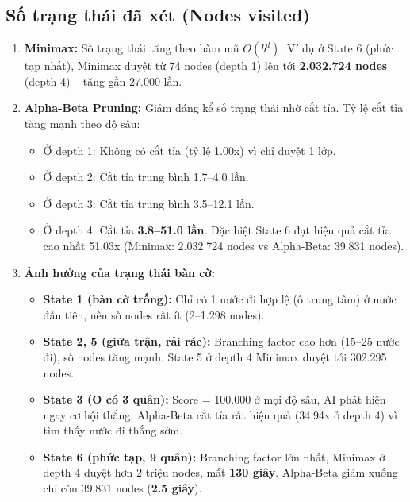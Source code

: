 \documentclass[12pt,a4paper]{article}
\begin{document}
\subsection{Số trạng thái đã xét (Nodes visited)}

\begin{enumerate}
    \item \textbf{Minimax:} Số trạng thái tăng theo hàm mũ $O(b^d)$. Ví dụ ở State 6 (phức tạp nhất), Minimax duyệt từ 74 nodes (depth 1) lên tới \textbf{2.032.724 nodes} (depth 4) -- tăng gần 27.000 lần.

    \item \textbf{Alpha-Beta Pruning:} Giảm đáng kể số trạng thái nhờ cắt tỉa. Tỷ lệ cắt tỉa tăng mạnh theo độ sâu:
    \begin{itemize}
        \item Ở depth 1: Không có cắt tỉa (tỷ lệ 1.00x) vì chỉ duyệt 1 lớp.
        \item Ở depth 2: Cắt tỉa trung bình 1.7--4.0 lần.
        \item Ở depth 3: Cắt tỉa trung bình 3.5--12.1 lần.
        \item Ở depth 4: Cắt tỉa \textbf{3.8--51.0 lần}. Đặc biệt State 6 đạt hiệu quả cắt tỉa cao nhất 51.03x (Minimax: 2.032.724 nodes vs Alpha-Beta: 39.831 nodes).
    \end{itemize}

    \item \textbf{Ảnh hưởng của trạng thái bàn cờ:}
    \begin{itemize}
        \item \textbf{State 1 (bàn cờ trống):} Chỉ có 1 nước đi hợp lệ (ô trung tâm) ở nước đầu tiên, nên số nodes rất ít (2--1.298 nodes).
        \item \textbf{State 2, 5 (giữa trận, rải rác):} Branching factor cao hơn (15--25 nước đi), số nodes tăng mạnh. State 5 ở depth 4 Minimax duyệt tới 302.295 nodes.
        \item \textbf{State 3 (O có 3 quân):} Score = 100.000 ở mọi độ sâu, AI phát hiện ngay cơ hội thắng. Alpha-Beta cắt tỉa rất hiệu quả (34.94x ở depth 4) vì tìm thấy nước đi thắng sớm.
        \item \textbf{State 6 (phức tạp, 9 quân):} Branching factor lớn nhất, Minimax ở depth 4 duyệt hơn 2 triệu nodes, mất \textbf{130 giây}. Alpha-Beta giảm xuống chỉ còn 39.831 nodes (\textbf{2.5 giây}).
    \end{itemize}
\end{enumerate}
\end{document}
